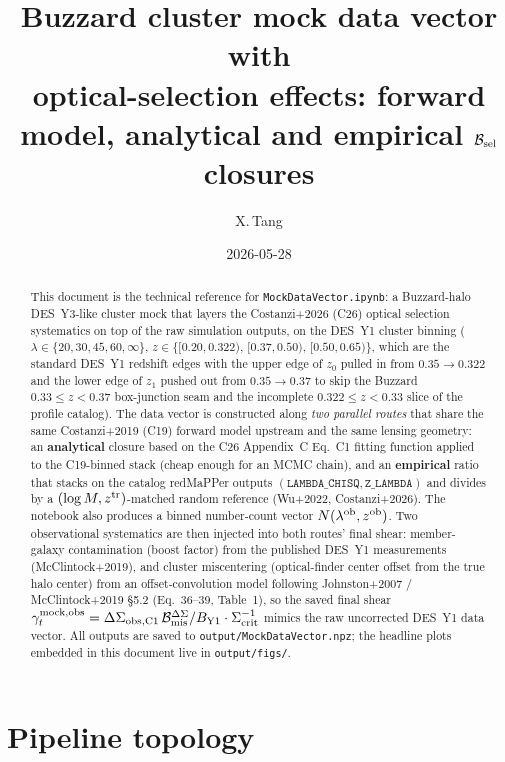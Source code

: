 \documentclass[a4paper, 11pt]{article}
\title{\vspace{-4ex}\huge \textbf{Buzzard cluster mock data vector with}\\[0.5ex]
       \Large \textbf{optical-selection effects: forward model,
                      analytical and empirical $\mathcal{B}_{\rm sel}$ closures}}
\author{X.\,Tang}
\date{2026-05-28}
\newcommand{\lob}{\lambda^{\rm ob}}
\newcommand{\zob}{z^{\rm ob}}
\newcommand{\ztr}{z^{\rm tr}}
\newcommand{\Bcal}{\mathcal{B}}
\newcommand{\modname}[1]{\textcolor{kwcol}{\texttt{#1}}}
\newcommand{\pyfile}[1]{{\small\texttt{#1}}}
\begin{document}
\maketitle

\begin{abstract}
This document is the technical reference for
\modname{MockDataVector.ipynb}: a Buzzard-halo DES~Y3-like cluster
mock that layers the Costanzi+2026 (C26) optical selection systematics on
top of the raw simulation outputs, on the DES~Y1 cluster binning
($\lambda \in \{20, 30, 45, 60, \infty\}$,
$z \in \{[0.20, 0.322),\allowbreak\,
[0.37, 0.50),\allowbreak\, [0.50, 0.65)\}$, which are the
standard DES~Y1 redshift edges with the upper edge of $z_0$ pulled in from $0.35 \to 0.322$ and the
lower edge of $z_1$ pushed out from $0.35 \to 0.37$ to skip the
Buzzard $0.33 \le z < 0.37$ box-junction seam and the incomplete
$0.322 \le z < 0.33$ slice of the profile catalog). The data vector is constructed along
\emph{two parallel routes} that share the same Costanzi+2019 (C19) forward model upstream
and the same lensing geometry: an \textbf{analytical} closure based on the
C26 Appendix~C Eq.~C1 fitting function applied to the C19-binned stack
(cheap enough for an MCMC chain), and an \textbf{empirical} ratio that
stacks on the catalog redMaPPer outputs $(\texttt{LAMBDA\_CHISQ},
\texttt{Z\_LAMBDA})$ and divides by a $(\log M, \ztr)$-matched random
reference (Wu+2022, Costanzi+2026). The notebook also produces a binned
number-count vector $N(\lob, \zob)$. Two observational systematics are
then injected into both routes' final shear: member-galaxy contamination
(boost factor) from the published DES~Y1 measurements (McClintock+2019),
and cluster miscentering (optical-finder center offset from the true
halo center) from an offset-convolution model following Johnston+2007 /
McClintock+2019 \S5.2 (Eq.~36--39, Table~1), so the saved final shear
$\gamma_t^{\rm mock,obs} = \Delta\Sigma_{\rm obs,C1}\,
\Bcal_{\rm mis}^{\Delta\Sigma}/B_{\rm Y1}\cdot\Sigma_{\rm crit}^{-1}$
mimics the raw uncorrected DES~Y1 data vector. All outputs are saved to
\pyfile{output/MockDataVector.npz}; the headline plots embedded in
this document live in \pyfile{output/figs/}.
\end{abstract}

\tableofcontents
\vspace{1em}

\section{Pipeline topology}
\label{sec:topology}
\end{document}
